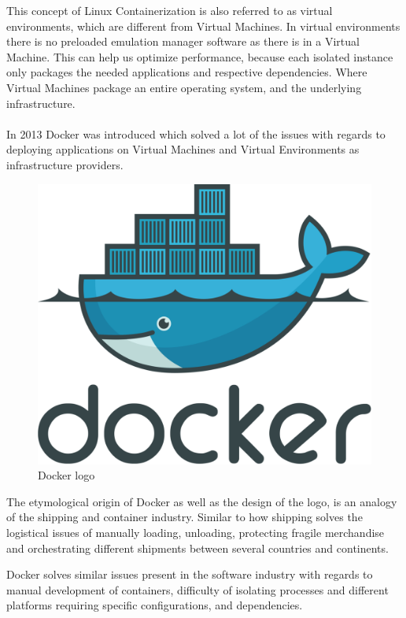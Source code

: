 \documentclass[a4paper,10pt]{article}
\begin{document}
	This concept of Linux Containerization is also referred to as virtual environments, which are different from Virtual Machines. In virtual environments there is no preloaded emulation manager software as there is in a Virtual Machine. This can help us optimize performance, because each isolated instance only packages the needed applications and respective dependencies. Where Virtual Machines package an entire operating system, and the underlying 
	infrastructure.\\\\
	\cite{CCC:2017}In 2013 Docker was introduced which solved a lot of the issues with regards to deploying applications on Virtual Machines and Virtual Environments as infrastructure providers. 
		\begin{figure}[H]
		\centering
		\label{marker}
		\includegraphics[width=\textwidth/2]{docker_logo}
		\caption{Docker logo}
	\end{figure}
	The etymological origin of Docker as well as the design of the logo, is an analogy of the shipping and container industry. Similar to how shipping solves the logistical issues of manually loading, unloading, protecting fragile merchandise and orchestrating different shipments between several countries and continents. 
	
	Docker solves similar issues present in the software industry with regards to manual development of containers, difficulty of isolating processes and different platforms requiring specific configurations, and dependencies.
	
\end{document}

